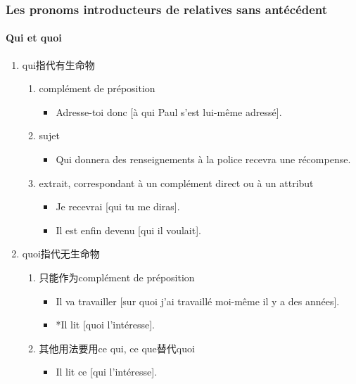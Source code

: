 \documentclass[UTF8]{report}
\begin{document}
\subsubsection{Les pronoms introducteurs de relatives sans antécédent}

\paragraph{Qui et quoi}
\begin{enumerate}
    \item qui指代有生命物
    \begin{enumerate}
        \item complément de préposition
        \begin{itemize}
            \item Adresse-toi donc [à qui Paul s’est lui-même adressé].
        \end{itemize}
        \item sujet
        \begin{itemize}
            \item Qui donnera des renseignements à la police recevra une récompense.
        \end{itemize}
        \item extrait,  correspondant à un complément direct ou à un attribut
        \begin{itemize}
            \item Je recevrai [qui tu me diras].
            \item Il est enfin devenu [qui il voulait].
        \end{itemize}
    \end{enumerate}
    \item quoi指代无生命物
    \begin{enumerate}
        \item 只能作为complément de préposition
        \begin{itemize}
            \item Il va travailler [sur quoi j’ai travaillé moi-même il y a des années].
            \item *Il lit [quoi l’intéresse].
        \end{itemize}
        \item 其他用法要用ce qui, ce que替代quoi
        \begin{itemize}
            \item Il lit ce [qui l’intéresse].
        \end{itemize}
    \end{enumerate}
\end{enumerate}
\end{document}
